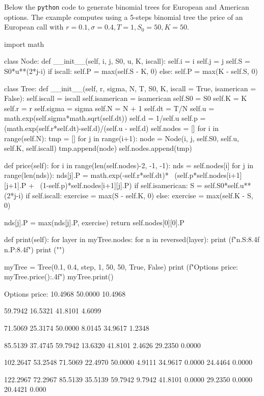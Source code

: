 Below the \texttt{python} code to generate binomial trees for European and American options.
The example computes using a 5-steps binomial tree the price of an European call with $r=0.1, \sigma=0.4, T=1, S_0=50, K=50$.

\begin{ipython}
import math

class Node:
    def __init__(self, i, j, S0, u, K, iscall):
        self.i = i
        self.j = j
        self.S = S0*u**(2*j-i)
        if iscall:
            self.P = max(self.S - K, 0)
        else:
            self.P = max(K - self.S, 0)
        
class Tree:
    def __init__(self, r, sigma, N, T, S0, K, iscall = True, isamerican = False):
        self.iscall = iscall
        self.isamerican = isamerican
        self.S0 = S0
        self.K = K
        self.r = r
        self.sigma = sigma
        self.N = N + 1
        self.dt = T/N
        self.u = math.exp(self.sigma*math.sqrt(self.dt))
        self.d = 1/self.u
        self.p = (math.exp(self.r*self.dt)-self.d)/(self.u - self.d)
        self.nodes = []
        for i in range(self.N):
            tmp = []
            for j in range(i+1):
                node = Node(i, j, self.S0, self.u, self.K, self.iscall)
                tmp.append(node)
            self.nodes.append(tmp)
            
    def price(self):
        for i in range(len(self.nodes)-2, -1, -1):
            nds = self.nodes[i]
            for j in range(len(nds)):
                nds[j].P = math.exp(-self.r*self.dt)* \
                                (self.p*self.nodes[i+1][j+1].P + \
                                (1-self.p)*self.nodes[i+1][j].P)
                if self.isamerican:
                    S = self.S0*self.u**(2*j-i)
                    if self.iscall:
                        exercise = max(S - self.K, 0)
                    else:
                        exercise = max(self.K - S, 0)

                    nds[j].P = max(nds[j].P, exercise)
        return self.nodes[0][0].P
            
    def print(self):
        for layer in myTree.nodes:
            for n in reversed(layer):
                print (f"{n.S:8.4f} {n.P:8.4f}") 
            print ("")

myTree = Tree(0.1, 0.4, step, 1, 50, 50, True, False)    
print (f"Options price: {myTree.price():.4f}")
myTree.print()
\end{ipython}
\begin{ioutput}
Options price: 10.4968
 50.0000  10.4968

 59.7942  16.5321
 41.8101   4.6099

 71.5069  25.3174
 50.0000   8.0145
 34.9617   1.2348

 85.5139  37.4745
 59.7942  13.6320
 41.8101   2.4626
 29.2350   0.0000

102.2647  53.2548
 71.5069  22.4970
 50.0000   4.9111
 34.9617   0.0000
 24.4464   0.0000

122.2967  72.2967
 85.5139  35.5139
 59.7942   9.7942
 41.8101   0.0000
 29.2350   0.0000
 20.4421   0.000
\end{ioutput}

